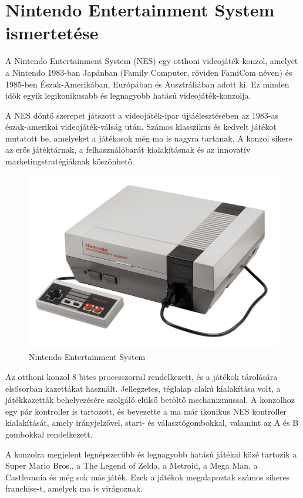 \chapter{Nintendo Entertainment System ismertetése}

A Nintendo Entertainment System (NES) egy otthoni videojáték-konzol, amelyet a Nintendo 1983-ban Japánban (Family Computer, röviden FamiCom néven) és 1985-ben Észak-Amerikában, Európában és Ausztráliában adott ki. Ez minden idők egyik legikonikusabb és legnagyobb hatású videojáték-konzolja.

A NES döntő szerepet játszott a videojáték-ipar újjáélesztésében az 1983-as észak-amerikai videojáték-válság után. Számos klasszikus és kedvelt játékot mutatott be, amelyeket a játékosok még ma is nagyra tartanak. A konzol sikere az erős játéktárnak, a felhasználóbarát kialakításnak és az innovatív marketingstratégiáknak köszönhető.
\begin{figure}[H]
	\centering
	\includegraphics[width=120mm, keepaspectratio]{figures/NES-console-set}
	\caption{Nintendo Entertainment System}
	\label{fig:NES-Consol}
\end{figure}

Az otthoni konzol 8 bites processzorral rendelkezett, és a játékok tárolására elsősorban kazettákat használt. Jellegzetes, téglalap alakú kialakítása volt, a játékkazetták behelyezésére szolgáló elülső betöltő mechanizmussal. A konzolhoz egy pár kontroller is tartozott, és bevezette a ma már ikonikus NES kontroller kialakítását, amely irányjelzővel, start- és választógombokkal, valamint az A és B gombokkal rendelkezett.

A konzolra megjelent legnépszerűbb és legnagyobb hatású játékai közé tartozik a Super Mario Bros., a The Legend of Zelda, a Metroid, a Mega Man, a Castlevania és még sok más játék. Ezek a játékok megalapoztak számos sikeres franchise-t, amelyek ma is virágoznak.

